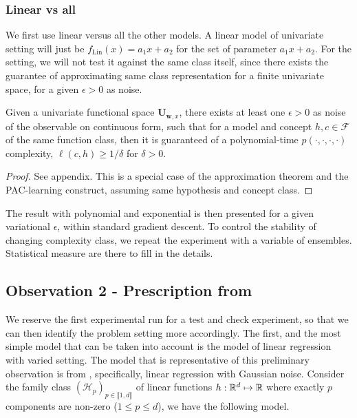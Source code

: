 \documentclass{article}
\begin{document}
\subsubsection{Linear vs all}
We first use linear versus all the other models. A linear model of univariate setting will just be $f_{\mathrm{Lin}}(x)=a_{1}x+a_{2}$ for the set of parameter $a_{1}x+a_{2}$. For the setting, we will not test it against the same class itself, since there exists the guarantee of approximating same class representation for a finite univariate space, for a given $\epsilon > 0$ as noise. 
\begin{theorem}
  Given a univariate functional space $\mathbf{U}_{\mathbf{w},x}$, there exists at least one $\epsilon > 0$ as noise of the observable on continuous form, such that for a model and concept $h,c\in \mathcal{F}$ of the same function class, then it is guaranteed of a polynomial-time $p(\cdot,\cdot,\cdot,\cdot)$ complexity, $\ell(c,h)\geq 1/\delta$ for $\delta > 0$. 
\end{theorem}
\begin{proof}
  See appendix. This is a special case of the approximation theorem and the PAC-learning construct, assuming same hypothesis and concept class. 
\end{proof}
The result with polynomial and exponential is then presented for a given variational $\epsilon$, within standard gradient descent. To control the stability of changing complexity class, we repeat the experiment with a variable of ensembles. Statistical measure are there to fill in the details. 



\subsection{Observation 2 - Prescription from \cite{lafon_understanding_2024}}
We reserve the first experimental run for a test and check experiment, so that we can then identify the problem setting more accordingly. The first, and the most simple model that can be taken into account is the model of linear regression with varied setting. The model that is representative of this preliminary observation is from \cite{lafon_understanding_2024}, specifically, linear regression with Gaussian noise. Consider the family class $(\mathcal{H}_p)_{p\in\llbracket1,d\rrbracket}$ of linear functions $h:\mathbb{R}^d\mapsto \mathbb{R}$ where exactly $p$ components are non-zero ($1\leq p\leq d$), we have the following model. 
\end{document}
